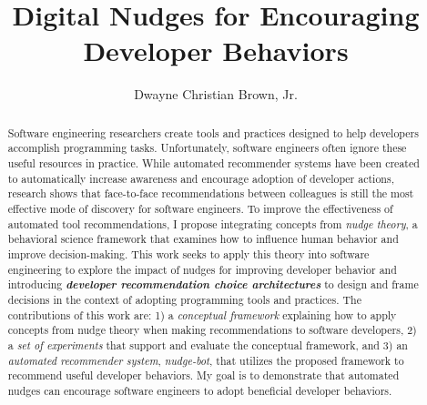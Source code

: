 \documentclass[runningheads]{llncs}
\begin{document}
%
\title{Digital Nudges for Encouraging \\Developer Behaviors}
%
%
\author{Dwayne Christian Brown, Jr.}
%
%
%
\maketitle              %
%
\begin{abstract}
Software engineering researchers create tools and practices designed to help developers accomplish programming tasks. Unfortunately, software engineers often ignore these useful resources in practice. While automated recommender systems have been created to automatically increase awareness and encourage adoption of developer actions, research shows that face-to-face recommendations between colleagues is still the most effective mode of discovery for software engineers. To improve the effectiveness of automated tool recommendations, I propose integrating concepts from \textit{nudge theory}, a behavioral science framework that examines how to influence human behavior and improve decision-making. This work seeks to apply this theory into software engineering to explore the impact of nudges for improving developer behavior and introducing \textbf{\em developer recommendation choice architectures} to design and frame decisions in the context of adopting programming tools and practices. The contributions of this work are: 1) a \textit{conceptual framework} explaining how to apply concepts from nudge theory when making recommendations to software developers, 2) a \textit{set of experiments} that support and evaluate the conceptual framework, and 3) an \textit{automated recommender system}, \textsl{nudge-bot}, that utilizes the proposed framework to recommend useful developer behaviors. My goal is to demonstrate that automated nudges can encourage software engineers to adopt beneficial developer behaviors.
\end{abstract}

\end{document}
